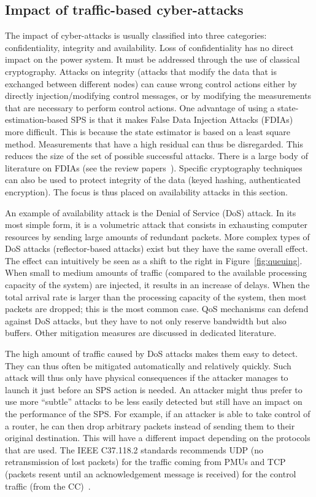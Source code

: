 \subsection{Impact of traffic-based cyber-attacks}
\label{sec:ICTtrafficAttack}

The impact of cyber-attacks is usually classified into three categories: confidentiality, integrity and availability. Loss of confidentiality has no direct impact on the power system. It must be addressed through the use of classical cryptography. Attacks on integrity (\ie attacks that modify the data that is exchanged between different nodes) can cause wrong control actions either by directly injection/modifying control messages, or by modifying the measurements that are necessary to perform control actions. One advantage of using a state-estimation-based SPS is that it makes False Data Injection Attacks (FDIAs) more difficult. This is because the state estimator is based on a least square method. Measurements that have a high residual can thus be disregarded. This reduces the size of the set of possible successful attacks. There is a large body of literature on FDIAs (see \eg the review papers~\cite{FDIAreview, FDIAreview2}). Specific cryptography techniques can also be used to protect integrity of the data (\eg keyed hashing, authenticated encryption). The focus is thus placed on availability attacks in this section.

An example of availability attack is the Denial of Service (DoS) attack. In its most simple form, it is a volumetric attack that consists in exhausting computer resources by sending large amounts of redundant packets. More complex types of DoS attacks (\eg reflector-based attacks) exist but they have the same overall effect. The effect can intuitively be seen as a shift to the right in Figure~\ref{fig:queuing}. When small to medium amounts of traffic (compared to the available processing capacity of the system) are injected, it results in an increase of delays. When the total arrival rate is larger than the processing capacity of the system, then most packets are dropped; this is the most common case. QoS mechanisms can defend against DoS attacks, but they have to not only reserve bandwidth but also buffers. Other mitigation measures are discussed in dedicated literature.

The high amount of traffic caused by DoS attacks makes them easy to detect. They can thus often be mitigated automatically and relatively quickly. Such attack will thus only have physical consequences if the attacker manages to launch it just before an SPS action is needed. An attacker might thus prefer to use more ``subtle'' attacks to be less easily detected but still have an impact on the performance of the SPS. For example, if an attacker is able to take control of a router, he can then drop arbitrary packets instead of sending them to their original destination. This will have a different impact depending on the protocols that are used. The IEEE C37.118.2 standards recommends UDP (\ie no retransmission of lost packets) for the traffic coming from PMUs and TCP (\ie packets resent until an acknowledgement message is received) for the control traffic (from the CC)~\cite{StandardC37-118-2}.

